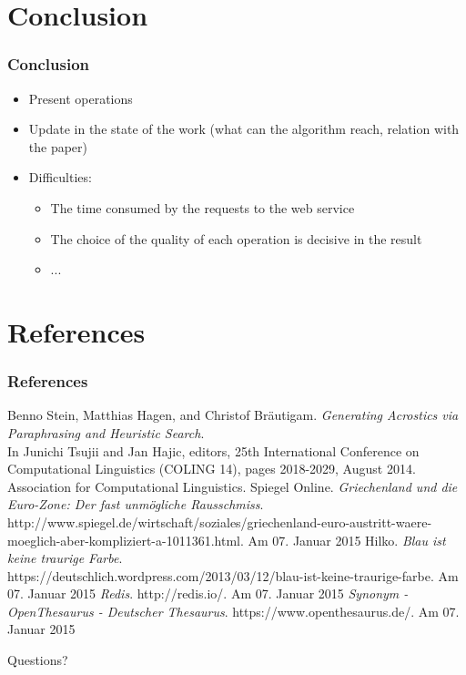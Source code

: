 \documentclass{beamer}
\begin{document}
\section{Conclusion}

\begin{frame}
\frametitle{Conclusion}
\begin{itemize}
\item Present operations
\item Update in the state of the work (what can the algorithm reach, relation with the paper)
\item Difficulties:
	\begin{itemize}
	\item The time consumed by the requests to the web service
	\item The choice of the quality of each operation is decisive in the result
	\item ...
	\end{itemize}
\end{itemize}
\end{frame}

\section{References}

\begin{frame}
\frametitle{References}
\scriptsize
\begin{thebibliography}{1}
	Benno Stein, Matthias Hagen, and Christof Bräutigam. \emph{Generating Acrostics via Paraphrasing and Heuristic Search}. \\
	In Junichi Tsujii and Jan Hajic, editors, 25th International Conference on Computational Linguistics (COLING 14), pages 2018-2029, August 2014. Association for Computational Linguistics.
	Spiegel Online. \emph{Griechenland und die Euro-Zone: Der fast unmögliche Rausschmiss}. \\
	http://www.spiegel.de/wirtschaft/soziales/griechenland-euro-austritt-waere-moeglich-aber-kompliziert-a-1011361.html. Am 07. Januar 2015
	Hilko. \emph{Blau ist keine traurige Farbe}. \\
	https://deutschlich.wordpress.com/2013/03/12/blau-ist-keine-traurige-farbe. Am 07. Januar 2015
	\emph{Redis}. http://redis.io/. Am 07. Januar 2015
	\emph{Synonym - OpenThesaurus - Deutscher Thesaurus}. https://www.openthesaurus.de/. Am 07. Januar 2015
\end{thebibliography}
\end{frame}

\begin{frame}
\Huge{\centerline{Questions?}}
\end{frame}

\end{document}
